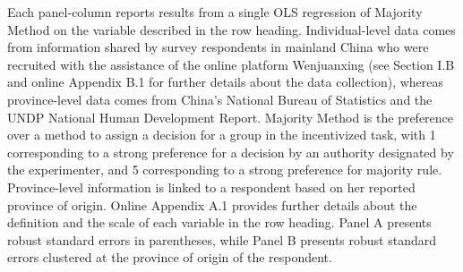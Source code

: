 \begin{table}
\begin{adjustwidth}{-1cm}{-1cm}
\begin{scriptsize}
    Each panel-column reports results from a single OLS regression of Majority Method on the variable described in the row heading. Individual-level data comes from information shared by survey respondents in mainland China who were recruited with the assistance of the online platform Wenjuanxing (see Section I.B and online Appendix B.1 for further details about the data collection), whereas province-level data comes from China's National Bureau of Statistics and the UNDP National Human Development Report. Majority Method is the preference over a method to assign a decision for a group in the incentivized task, with 1 corresponding to a strong preference for a decision by an authority designated by the experimenter, and 5 corresponding to a strong preference for majority rule. Province-level information is linked to a respondent based on her reported province of origin. Online Appendix A.1 provides further details about the definition and the scale of each variable in the row heading. Panel A presents robust standard errors in parentheses, while Panel B presents robust standard errors clustered at the province of origin of the respondent.           
        \end{scriptsize} 
    \end{adjustwidth} 
\end{table}

